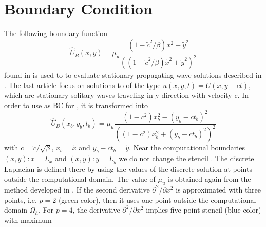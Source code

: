 \documentclass[11pt,a4paper,twoside]{article}
\begin{document}
\section{Boundary Condition}\label{BndS}
The following boundary function
\begin{equation}\label{eqBCV}
\widehat U_B(x , y) = \mu_u \frac{ (1 - \tilde c^2/\beta) x^2 - \tilde y^2}{( (1 - \tilde c^2/\beta) \tilde x^2 + \tilde y^2)^2}
\end{equation}
found in \cite{BoundaryProblem} is used to to evaluate stationary propagating wave solutions described in \cite{EllipticProblem}. The last article focus on solutions to  of the type $u(x, y, t) = U(x, y - ct)$, which are stationary solitary waves traveling in y direction
with velocity c. In order to use  as BC for , it is transformed into
\begin{equation}\label{eqBCH}
\widehat U_B(x_b , y_b, t_b) = \mu_u \frac{ (1 - c^2) x_b^2 - (y_b-ct_b)^2}{( (1 - c^2) x_b^2 + (y_b-ct_b)^2)^2}
\end{equation}
with $c = \tilde c / \sqrt{\beta}$, $x_b = \tilde x$ and $y_b - ct_b = \tilde y$. 
Near the computational boundaries $(x,y):x=L_x$ and $(x,y):y=L_y$ we do not change the stencil . The discrete Laplacian
is defined there by using the values of the discrete solution  at points outside the computational domain. The value of $\mu_u$ is obtained again from the method developed in \cite{BoundaryProblem}. If the second derivative $\partial^2 / \partial x^2$ is approximated with three points, i.e. $p=2$ (green color), then it uses one point outside the computational domain $\Omega_h$. For $p=4$, the derivative $\partial^2 / \partial x^2$ implies five point stencil (blue color) with maximum
\end{document}
